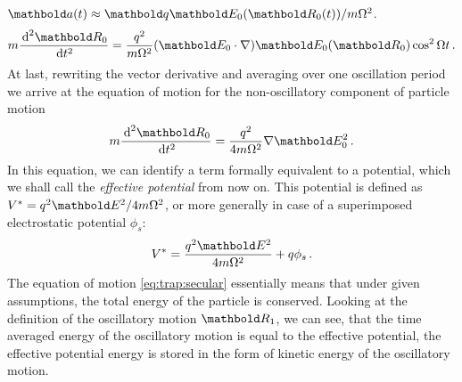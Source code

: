 $\mb a(t) \approx \mb q\mb E_0(\mb R_0(t))/m\Omega^2$.
\begin{equation}
m\frac{\de^2\mb R_0}{\de t^2} =
\frac{q^2}{m\Omega^2}(\mb E_0\cdot\nabla)\mb E_0(\mb R_0)\cos^2\Omega t\,.
\end{equation}
At last, rewriting the vector derivative and averaging over one
oscillation period we arrive at the equation of motion for the
non-oscillatory component of particle motion
\begin{equation}
m\frac{\de^2\mb R_0}{\de t^2} =
\frac{q^2}{4m\Omega^2}\nabla\mb E_0^2\,.
\label{eq:trap:secular}
\end{equation}
In this equation, we can identify a term formally equivalent
to a potential, which we shall call the {\em effective potential}
from now on. This potential is defined as
$V^* = {q^2\mb E^2}/{4m\Omega^2}$,
or more generally in case of a superimposed electrostatic potential
$\phi_s$:
\begin{equation}
V^* = \frac{q^2\mb E^2}{4m\Omega^2} + q\phi_s\,.
\end{equation}
The equation of motion \eqref{eq:trap:secular} essentially means
that under given assumptions, the total energy of the particle
is conserved. Looking at the definition of the oscillatory
motion $\mb R_1$, we can see, that the time averaged energy
of the oscillatory motion is equal to the effective potential, \ie
the effective potential energy is stored in the form of kinetic
energy of the oscillatory motion.
